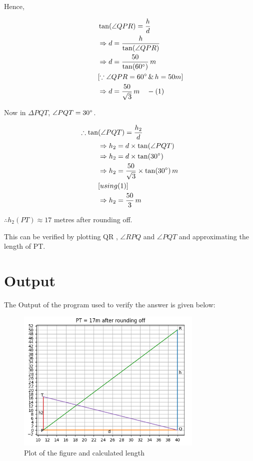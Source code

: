 \documentclass[journal,12pt,twocolumn]{IEEEtran}
\begin{document}
\noindent Hence, 

\begin{align*}
\hspace{30pt}&\tan(\angle QPR) = \frac{h}{d} \\
&\Rightarrow d = \frac{h}{\tan(\angle QPR)} \\
&\Rightarrow d = \frac{50}{\tan(60\degree)}\, m \\
&[\because \angle QPR = 60\degree \, \& \, h = 50m] \\
&\Rightarrow d = \frac{50}{\sqrt{3}}\, m \hspace{10pt}-(1)
\end{align*}

Now in $\Delta PQT$, $\angle PQT = 30\degree$.

\begin{align*}
\therefore \tan&(\angle PQT) = \frac{h_2}{d} \\
&\Rightarrow h_2 = d \times \tan(\angle PQT)\\
&\Rightarrow h_2 = d \times \tan(30 \degree)\\
&\Rightarrow h_2 = \frac{50}{\sqrt{3}} \times \tan(30 \degree) \, m \\
&[using (1)]\\
&\Rightarrow h_2 = \frac{50}{3}\, m
\end{align*}

\noindent $\therefore h_2(PT)   \approx 17 $ metres after rounding off.

\vspace{2pt}
\noindent This can be verified by plotting QR , $\angle RPQ$ and $\angle PQT$ and approximating 
\noindent the length of PT.


\newpage

\section*{Output}
\noindent The Output of the program used to verify the answer is given below:

\begin{figure}[h]
\includegraphics[width=252pt]{output.png}
\caption{Plot of the figure and calculated length}

\end{figure}
\end{document}
